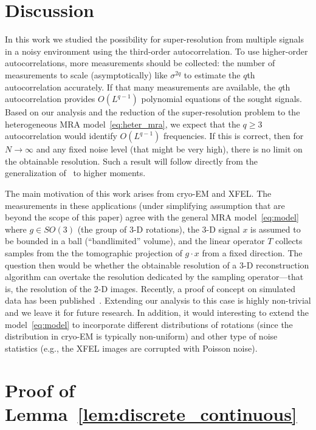 \documentclass[english,12pt]{article}
\numberwithin{equation}{section}
\numberwithin{thm}{section} %
\begin{document}
\section{Discussion} \label{sec:future_work}


In this work we studied the possibility for super-resolution from multiple signals in a noisy environment using the third-order autocorrelation.
To use higher-order autocorrelations, more measurements should be collected: the number of measurements to scale (asymptotically) like $\sigma^{2q}$ to estimate the $q$th autocorrelation accurately.
If that many measurements are available, the $q$th autocorrelation provides $O(L^{q-1})$ polynomial equations of the sought signals.
Based on our analysis and the reduction of the super-resolution problem to the heterogeneous MRA model~\eqref{eq:heter_mra}, we expect that the $q\geq3$ autocorrelation would identify $O(L^{q-1})$ frequencies. 
If this is correct, then for $N\to\infty$ and any fixed noise level (that might be very high), there is no limit on the obtainable resolution.
Such a  result will follow directly from the generalization of~\cite{bandeira2017estimation} to higher moments. 

The main motivation of this work arises from cryo-EM and XFEL. 
The measurements in these applications  (under simplifying assumption that are beyond the scope of this paper)
agree with the general MRA model~\eqref{eq:model} where $g\in SO(3)$ (the group of 3-D rotations),  the 3-D signal $x$ is assumed to be bounded in a ball (``bandlimited'' volume), and the linear operator $T$ collects samples from the the tomographic projection of $g\cdot x$ from a fixed direction. The question then would be whether the obtainable resolution of a 3-D reconstruction algorithm can overtake the resolution dedicated by the sampling operator---that is, the resolution of the 2-D images. Recently, a proof of concept on simulated  data has been published~\cite{chen2018single}. Extending our analysis to this case is highly non-trivial and we leave it for future research. 
In addition, it would interesting to extend the model~\eqref{eq:model} to incorporate  different distributions of rotations (since the  distribution in cryo-EM is typically non-uniform) and other type of noise statistics (e.g., the  XFEL images are corrupted with Poisson noise).





\appendix

\section{Proof of Lemma~\ref{lem:discrete_continuous}}  
\label{sec:proof_lem:discrete_continuous}
\end{document}
